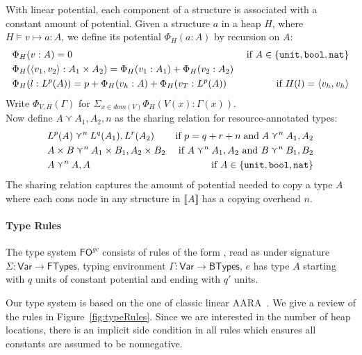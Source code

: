 \documentclass{easychair}
\newcommand{\ms}[1]{\ensuremath{\mathsf{#1}}}
\newcommand{\irl}[1]{\mathtt{#1}}
\newcounter{rule}
\newcommand{\fogc}{\ms{FO}^{gc}}
\theoremstyle{definition}
\begin{document}
With linear potential, each component of a structure is associated with a constant amount of 
potential.  Given a structure $a$ in a heap $H$, where  $H \vDash v \mapsto a : A$, we define 
its potential $\Phi_H(a : A)$ by recursion on $A$: 
%
\begin{align*}
	&\Phi_H(v : A) = 0 &\text{ if } A \in \{\unittycst, \booltyabt, \irl{nat}\}\\
&\Phi_H(\pairexcst{v_1}{v_2} : \prodtycst{A_1}{A_2}) = \Phi_H(v_1 : A_1) + \Phi_H(v_2 : A_2)\\
	&\Phi_H(l : L^p(A)) = p + \Phi_H(v_h : A) + \Phi_H(v_T : L^p(A)) &\text{ if } 
		H(l) = \pairexcst{v_h}{v_h}
\end{align*}
%
Write $\Phi_{V,H}(\Gamma)$ for $\Sigma_{x \in dom(V)} \Phi_H(V(x) : \Gamma(x))$.\\
Now define $A \curlyvee A_1,A_2,n$ as the sharing relation for resource-annotated types:
\begin{align*}
	&L^p(A) \curlyvee^n L^q(A_1),L^r(A_2) & \text{if } p = q + r + n \;\text{and}\; 
			A \curlyvee^n A_1,A_2\\
	&\prodtycst{A}{B} \curlyvee^n \prodtycst{A_1}{B_1}, \prodtycst{A_2}{B_2}
		&\text{ if } A \curlyvee^n A_1,A_2 \text{ and } B \curlyvee^n B_1,B_2\\
	&A \curlyvee^n  A,A& \text{ if } A \in \{\unittycst, \booltycst, \irl{nat}\}
\end{align*}
The sharing relation captures the amount of potential needed to copy a type $A$ where each 
cons node in any structure in $\llbracket A \rrbracket$ has a copying overhead $n$.

\paragraph{Type Rules}
\label{sect:typing}
The type system $\fogc$ consists of rules of the form , 
read as under signature $\Sigma : \ms{Var} \to \ms{FTypes}$, 
typing environment $\Gamma : \ms{Var} \to \ms{BTypes}$, $e$ has type $A$ starting with $q$ units of 
constant potential and ending with $q'$ units.

Our type system is based on the one of classic linear AARA~\cite{Jost03}. 
We give a review of the rules in Figure~\ref{fig:typeRules}.
Since we are interested in the number of heap locations, 
there is an implicit side condition in all rules
which ensures all constants are assumed to be nonnegative.
	
\end{document}
